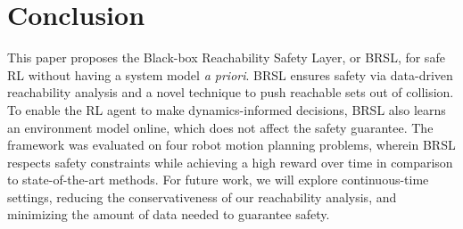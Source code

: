 \section{Conclusion}\label{sec:con}

This paper proposes the Black-box Reachability Safety Layer, or BRSL, for safe RL without having a system model \textit{a priori}.
BRSL ensures safety via data-driven reachability analysis and a novel technique to push reachable sets out of collision.
To enable the RL agent to make dynamics-informed decisions, BRSL also learns an environment model online, which does not affect the safety guarantee.
The framework was evaluated on four robot motion planning problems, wherein BRSL respects safety constraints while achieving a high reward over time in comparison to state-of-the-art methods.
For future work, we will explore continuous-time settings, reducing the conservativeness of our reachability analysis, and minimizing the amount of data needed to guarantee safety.